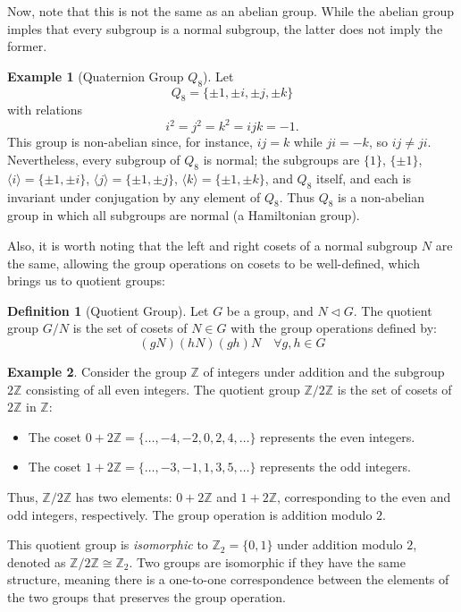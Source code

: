 \documentclass[12pt]{article}
\theoremstyle{definition}
\newtheorem{definition}[theorem]{Definition}
\newtheorem*{example}{Example}
\begin{document}
Now, note that this is not the same as an abelian group. While the abelian group imples that every subgroup is a normal subgroup, the latter does not imply the former.

\begin{example}[Quaternion Group $Q_8$]
Let $$Q_8=\{\pm 1,\pm i,\pm j,\pm k\}$$ with relations $$i^2=j^2=k^2=ijk=-1.$$ This group is non-abelian since, for instance, $ij=k$ while $ji=-k$, so $ij\neq ji$. Nevertheless, every subgroup of $Q_8$ is normal; the subgroups are $\{1\}$, $\{\pm 1\}$, $\langle i\rangle=\{\pm 1,\pm i\}$, $\langle j\rangle=\{\pm 1,\pm j\}$, $\langle k\rangle=\{\pm 1,\pm k\}$, and $Q_8$ itself, and each is invariant under conjugation by any element of $Q_8$. Thus $Q_8$ is a non-abelian group in which all subgroups are normal (a Hamiltonian group).
\end{example}



Also, it is worth noting that the left and right cosets of a normal subgroup $N$ are the same, allowing the group operations on cosets to be well-defined, which brings us to quotient groups:

\begin{definition}[Quotient Group]
    Let $G$ be a group, and $N \triangleleft G$. The quotient group $G / N$ is the set of cosets of $N \in G$ with the group operations defined by: $$(gN) (hN) (gh)N \quad \forall g, h \in G$$
\end{definition}

\begin{example}
    Consider the group $\mathbb{Z}$ of integers under addition and the subgroup $2\mathbb{Z}$ consisting of all even integers. The quotient group $\mathbb{Z}/2\mathbb{Z}$ is the set of cosets of $2\mathbb{Z}$ in $\mathbb{Z}$:

\begin{itemize}
\item The coset $0+2\mathbb{Z}=\{\ldots,-4,-2,0,2,4,\ldots\}$ represents the even integers.
\item The coset $1+2\mathbb{Z}=\{\ldots,-3,-1,1,3,5,\ldots\}$ represents the odd integers.
\end{itemize}

Thus, $\mathbb{Z}/2\mathbb{Z}$ has two elements: $0+2\mathbb{Z}$ and $1+2\mathbb{Z}$, corresponding to the even and odd integers, respectively. The group operation is addition modulo $2$.
\end{example}

This quotient group is \emph{isomorphic} to $\mathbb{Z}_2=\{0,1\}$ under addition modulo $2$, denoted as $\mathbb{Z}/2\mathbb{Z}\cong \mathbb{Z}_2$. Two groups are isomorphic if they have the same structure, meaning there is a one-to-one correspondence between the elements of the two groups that preserves the group operation.
\end{document}
